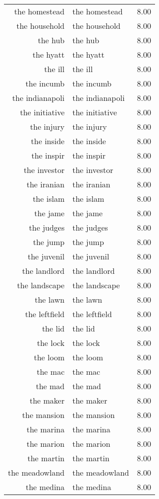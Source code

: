 \begin{table}[ht]
\begin{tabular}{rlr}
  the homestead & the homestead & 8.00 \\ 
  the household & the household & 8.00 \\ 
  the hub & the hub & 8.00 \\ 
  the hyatt & the hyatt & 8.00 \\ 
  the ill & the ill & 8.00 \\ 
  the incumb & the incumb & 8.00 \\ 
  the indianapoli & the indianapoli & 8.00 \\ 
  the initiative & the initiative & 8.00 \\ 
  the injury & the injury & 8.00 \\ 
  the inside & the inside & 8.00 \\ 
  the inspir & the inspir & 8.00 \\ 
  the investor & the investor & 8.00 \\ 
  the iranian & the iranian & 8.00 \\ 
  the islam & the islam & 8.00 \\ 
  the jame & the jame & 8.00 \\ 
  the judges & the judges & 8.00 \\ 
  the jump & the jump & 8.00 \\ 
  the juvenil & the juvenil & 8.00 \\ 
  the landlord & the landlord & 8.00 \\ 
  the landscape & the landscape & 8.00 \\ 
  the lawn & the lawn & 8.00 \\ 
  the leftfield & the leftfield & 8.00 \\ 
  the lid & the lid & 8.00 \\ 
  the lock & the lock & 8.00 \\ 
  the loom & the loom & 8.00 \\ 
  the mac & the mac & 8.00 \\ 
  the mad & the mad & 8.00 \\ 
  the maker & the maker & 8.00 \\ 
  the mansion & the mansion & 8.00 \\ 
  the marina & the marina & 8.00 \\ 
  the marion & the marion & 8.00 \\ 
  the martin & the martin & 8.00 \\ 
  the meadowland & the meadowland & 8.00 \\ 
  the medina & the medina & 8.00 \\ 

\end{tabular}
\end{table}
